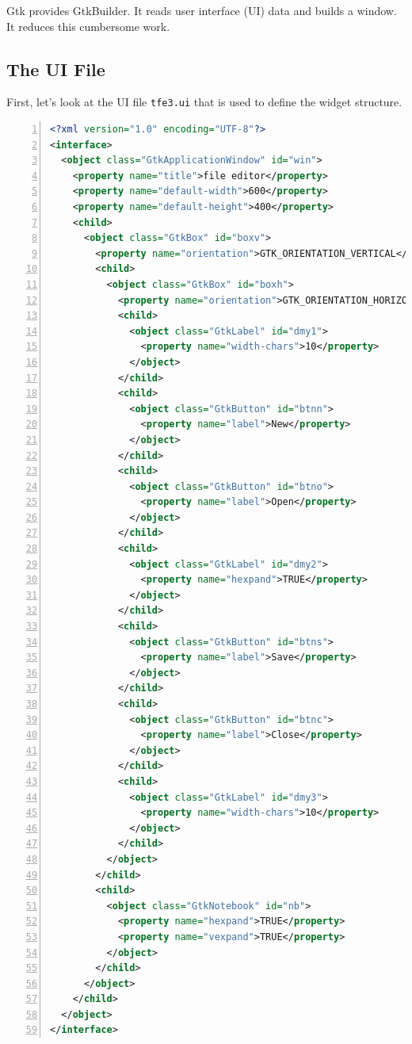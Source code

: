 Gtk provides GtkBuilder. It reads user interface (UI) data and builds a
window. It reduces this cumbersome work.

\hypertarget{the-ui-file}{%
\subsection{The UI File}\label{the-ui-file}}

First, let's look at the UI file \passthrough{\lstinline!tfe3.ui!} that
is used to define the widget structure.

\begin{lstlisting}[language=XML, numbers=left]
<?xml version="1.0" encoding="UTF-8"?>
<interface>
  <object class="GtkApplicationWindow" id="win">
    <property name="title">file editor</property>
    <property name="default-width">600</property>
    <property name="default-height">400</property>
    <child>
      <object class="GtkBox" id="boxv">
        <property name="orientation">GTK_ORIENTATION_VERTICAL</property>
        <child>
          <object class="GtkBox" id="boxh">
            <property name="orientation">GTK_ORIENTATION_HORIZONTAL</property>
            <child>
              <object class="GtkLabel" id="dmy1">
                <property name="width-chars">10</property>
              </object>
            </child>
            <child>
              <object class="GtkButton" id="btnn">
                <property name="label">New</property>
              </object>
            </child>
            <child>
              <object class="GtkButton" id="btno">
                <property name="label">Open</property>
              </object>
            </child>
            <child>
              <object class="GtkLabel" id="dmy2">
                <property name="hexpand">TRUE</property>
              </object>
            </child>
            <child>
              <object class="GtkButton" id="btns">
                <property name="label">Save</property>
              </object>
            </child>
            <child>
              <object class="GtkButton" id="btnc">
                <property name="label">Close</property>
              </object>
            </child>
            <child>
              <object class="GtkLabel" id="dmy3">
                <property name="width-chars">10</property>
              </object>
            </child>
          </object>
        </child>
        <child>
          <object class="GtkNotebook" id="nb">
            <property name="hexpand">TRUE</property>
            <property name="vexpand">TRUE</property>
          </object>
        </child>
      </object>
    </child>
  </object>
</interface>
\end{lstlisting}

